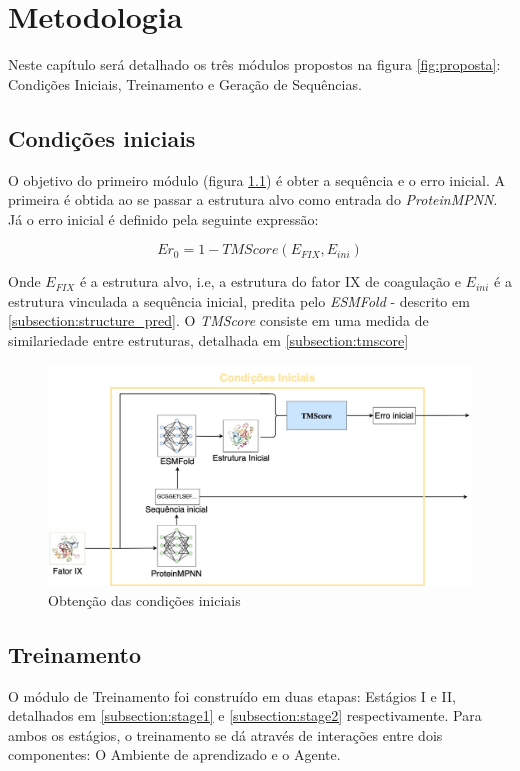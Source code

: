 
\chapter{Metodologia}

Neste capítulo será detalhado os três módulos propostos na figura \ref{fig:proposta}: Condições Iniciais, Treinamento e Geração de Sequências. 

\section{Condições iniciais}
O objetivo do primeiro módulo (figura \ref{fig:cond_iniciais}) é obter a sequência e o erro inicial. 
A primeira é obtida ao se passar a estrutura alvo como entrada do \textit{ProteinMPNN}.
Já o erro inicial é definido pela seguinte expressão:
 
\begin{equation}
    Er_{0} = 1 - TMScore(E_{FIX}, E_{ini})
\end{equation}

\noindent
Onde $E_{FIX}$ é a estrutura alvo, i.e, a estrutura do fator IX de coagulação e $E_{ini}$ é a estrutura vinculada a sequência inicial, 
predita pelo \textit{ESMFold} - descrito em \ref{subsection:structure_pred}. 
O \textit{TMScore} consiste em uma medida de similariedade entre estruturas, detalhada em \ref{subsection:tmscore}

\begin{figure}[H]
  \centering
  \includegraphics[width=.8\textwidth]{figuras/metodologia-Initial_cond.jpg}
  \caption{Obtenção das condições iniciais}
  \label{fig:cond_iniciais}
\end{figure}

\section{Treinamento}
O módulo de Treinamento foi construído em duas etapas: Estágios I e II, detalhados em \ref{subsection:stage1} e \ref{subsection:stage2} respectivamente.
Para ambos os estágios, o treinamento se dá através de interações entre dois componentes: O Ambiente de aprendizado e o Agente. 

